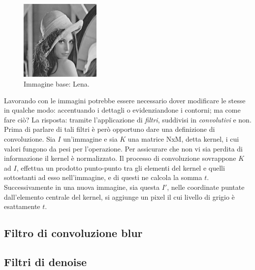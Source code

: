\documentclass{subfiles}
\begin{document}
\begin{figure}
    \centering
    \includegraphics[width = 0.35\textwidth]{../../Figure/Other/Lena/Lena.png}
    \caption{Immagine base: Lena.}
    \label{fig:3.1}
\end{figure}
Lavorando con le immagini potrebbe essere necessario dover modificare le stesse in qualche modo: accentuando i dettagli o evidenziandone i contorni; ma come fare ciò?
La risposta: tramite l'applicazione di \emph{filtri}, suddivisi in \emph{convolutivi} e non.
Prima di parlare di tali filtri è però opportuno dare una definizione di convoluzione\footnotemark[2].
Sia \(I\) un'immagine e sia \(K\) una matrice NxM, detta kernel\footnotemark[3], i cui valori fungono da pesi per l'operazione.
Per assicurare che non vi sia perdita di informazione il kernel è normalizzato.
Il processo di convoluzione sovrappone \(K\) ad \(I\), effettua un prodotto punto-punto tra gli elementi del kernel e quelli sottostanti ad esso nell'immagine,
e di questi ne calcola la somma \(t\). Successivamente in una nuova immagine, sia questa \(I'\), nelle coordinate puntate dall'elemento centrale del kernel,
si aggiunge un pixel il cui livello di grigio è esattamente \(t\).

\subsection{Filtro di convoluzione blur}


\clearpage

\subsection{Filtri di denoise}

\end{document}
